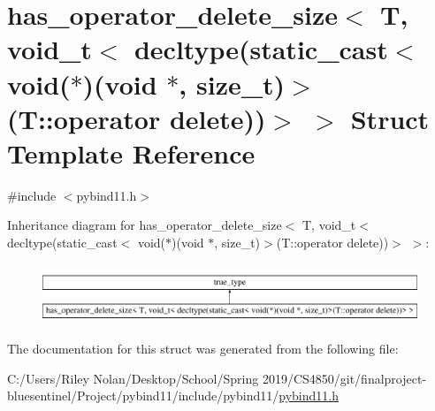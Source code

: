 \hypertarget{structhas__operator__delete__size_3_01_t_00_01void__t_3_01decltype_07static__cast_3_01void_07_5_e659cd67a562b6670920a523a8edb40c}{}\section{has\+\_\+operator\+\_\+delete\+\_\+size$<$ T, void\+\_\+t$<$ decltype(static\+\_\+cast$<$ void($\ast$)(void $\ast$, size\+\_\+t)$>$(T\+::operator delete))$>$ $>$ Struct Template Reference}
\label{structhas__operator__delete__size_3_01_t_00_01void__t_3_01decltype_07static__cast_3_01void_07_5_e659cd67a562b6670920a523a8edb40c}


{\ttfamily \#include $<$pybind11.\+h$>$}

Inheritance diagram for has\+\_\+operator\+\_\+delete\+\_\+size$<$ T, void\+\_\+t$<$ decltype(static\+\_\+cast$<$ void($\ast$)(void $\ast$, size\+\_\+t)$>$(T\+::operator delete))$>$ $>$\+:\begin{figure}[H]
\begin{center}
\leavevmode
\includegraphics[height=1.794872cm]{structhas__operator__delete__size_3_01_t_00_01void__t_3_01decltype_07static__cast_3_01void_07_5_e659cd67a562b6670920a523a8edb40c}
\end{center}
\end{figure}


The documentation for this struct was generated from the following file\+:\begin{DoxyCompactItemize}
\item 
C\+:/\+Users/\+Riley Nolan/\+Desktop/\+School/\+Spring 2019/\+C\+S4850/git/finalproject-\/bluesentinel/\+Project/pybind11/include/pybind11/\mbox{\hyperlink{pybind11_8h}{pybind11.\+h}}\end{DoxyCompactItemize}
